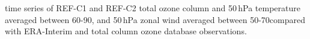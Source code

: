 \label{fig:time_series}
time series of REF-C1 and REF-C2 total ozone column and 50\,hPa temperature averaged between 60-90\degrees, and 50\,hPa zonal wind averaged between 50-70\degrees compared with ERA-Interim and total column ozone database observations.